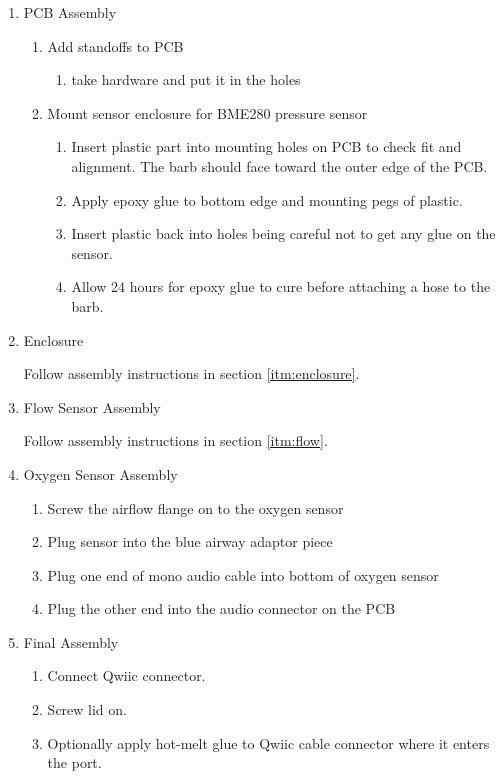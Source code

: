 \documentclass[11pt, letterpaper]{article}
\begin{document}
\begin{enumerate}
\item
PCB Assembly

\begin{enumerate}[label=1.\arabic*]
\item Add standoffs to PCB
\begin{enumerate}[label=1.1.\arabic*]
\item take hardware and put it in the holes
\end{enumerate}

\item Mount sensor enclosure for BME280 pressure sensor
\begin{enumerate}[label=1.2.\arabic*]
\item Insert plastic part into mounting holes on PCB to check fit and alignment. The barb should face toward the outer edge of the PCB.
\item Apply epoxy glue to bottom edge and mounting pegs of plastic.
\item Insert plastic back into holes being careful not to get any glue on the sensor.
\item Allow 24 hours for epoxy glue to cure before attaching a hose to the barb.
\end{enumerate}


\end{enumerate}

\item
Enclosure

Follow assembly instructions in section \ref{itm:enclosure}.

\item
Flow Sensor Assembly

Follow assembly instructions in section \ref{itm:flow}.

\item
Oxygen Sensor Assembly

\begin{enumerate}[label=4.\arabic*]
\item
Screw the airflow flange on to the oxygen sensor
\item
Plug sensor into the blue airway adaptor piece
\item
Plug one end of mono audio cable into bottom of oxygen sensor
\item
Plug the other end into the audio connector on the PCB
\end{enumerate}

\item
  Final Assembly
  \begin{enumerate}[label=4.\arabic*]
  \item Connect Qwiic connector.
  \item Screw lid on.
    \item Optionally apply hot-melt glue to Qwiic cable connector where it enters the port.
    \end{enumerate}

\end{enumerate}
\end{document}
